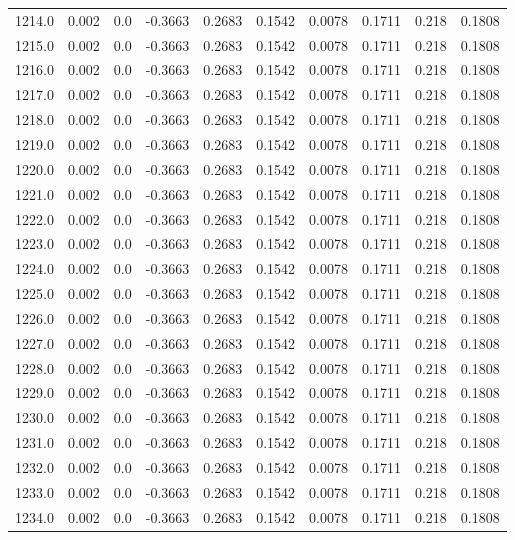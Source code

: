 \begin{longtable}{lrrrrrrrrr}
1214.0 & 0.002 & 0.0 & -0.3663 & 0.2683 & 0.1542 & 0.0078 & 0.1711 & 0.218 & 0.1808 \\
1215.0 & 0.002 & 0.0 & -0.3663 & 0.2683 & 0.1542 & 0.0078 & 0.1711 & 0.218 & 0.1808 \\
1216.0 & 0.002 & 0.0 & -0.3663 & 0.2683 & 0.1542 & 0.0078 & 0.1711 & 0.218 & 0.1808 \\
1217.0 & 0.002 & 0.0 & -0.3663 & 0.2683 & 0.1542 & 0.0078 & 0.1711 & 0.218 & 0.1808 \\
1218.0 & 0.002 & 0.0 & -0.3663 & 0.2683 & 0.1542 & 0.0078 & 0.1711 & 0.218 & 0.1808 \\
1219.0 & 0.002 & 0.0 & -0.3663 & 0.2683 & 0.1542 & 0.0078 & 0.1711 & 0.218 & 0.1808 \\
1220.0 & 0.002 & 0.0 & -0.3663 & 0.2683 & 0.1542 & 0.0078 & 0.1711 & 0.218 & 0.1808 \\
1221.0 & 0.002 & 0.0 & -0.3663 & 0.2683 & 0.1542 & 0.0078 & 0.1711 & 0.218 & 0.1808 \\
1222.0 & 0.002 & 0.0 & -0.3663 & 0.2683 & 0.1542 & 0.0078 & 0.1711 & 0.218 & 0.1808 \\
1223.0 & 0.002 & 0.0 & -0.3663 & 0.2683 & 0.1542 & 0.0078 & 0.1711 & 0.218 & 0.1808 \\
1224.0 & 0.002 & 0.0 & -0.3663 & 0.2683 & 0.1542 & 0.0078 & 0.1711 & 0.218 & 0.1808 \\
1225.0 & 0.002 & 0.0 & -0.3663 & 0.2683 & 0.1542 & 0.0078 & 0.1711 & 0.218 & 0.1808 \\
1226.0 & 0.002 & 0.0 & -0.3663 & 0.2683 & 0.1542 & 0.0078 & 0.1711 & 0.218 & 0.1808 \\
1227.0 & 0.002 & 0.0 & -0.3663 & 0.2683 & 0.1542 & 0.0078 & 0.1711 & 0.218 & 0.1808 \\
1228.0 & 0.002 & 0.0 & -0.3663 & 0.2683 & 0.1542 & 0.0078 & 0.1711 & 0.218 & 0.1808 \\
1229.0 & 0.002 & 0.0 & -0.3663 & 0.2683 & 0.1542 & 0.0078 & 0.1711 & 0.218 & 0.1808 \\
1230.0 & 0.002 & 0.0 & -0.3663 & 0.2683 & 0.1542 & 0.0078 & 0.1711 & 0.218 & 0.1808 \\
1231.0 & 0.002 & 0.0 & -0.3663 & 0.2683 & 0.1542 & 0.0078 & 0.1711 & 0.218 & 0.1808 \\
1232.0 & 0.002 & 0.0 & -0.3663 & 0.2683 & 0.1542 & 0.0078 & 0.1711 & 0.218 & 0.1808 \\
1233.0 & 0.002 & 0.0 & -0.3663 & 0.2683 & 0.1542 & 0.0078 & 0.1711 & 0.218 & 0.1808 \\
1234.0 & 0.002 & 0.0 & -0.3663 & 0.2683 & 0.1542 & 0.0078 & 0.1711 & 0.218 & 0.1808 \\

\end{longtable}
